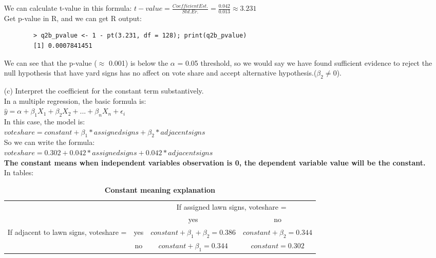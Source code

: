 \documentclass[12pt,letterpaper]{article}
\begin{document}
\begin{enumerate}
	We can calculate t-value in this formula: $t-value = \frac{Coefficient Est.}{Std. Er.} = \frac{0.042}{0.013} \approx 3.231$\\
	Get p-value in R, and we can get R output: 
	\begin{verbatim}
		> q2b_pvalue <- 1 - pt(3.231, df = 128); print(q2b_pvalue)
		[1] 0.0007841451
	\end{verbatim} 
	
	We can see that the p-value ($\approx$ 0.001) is below the $\alpha$ = 0.05 threshold, so we would say we have found sufficient evidence to reject the null hypothesis that have yard signs has no affect on vote share and accept alternative hypothesis.($\beta_2 \neq 0$).
	
	\newpage
	
	\item [(c)] Interpret the coefficient for the constant term substantively.\\
	
	In a multiple regression, the basic formula is:\\
	$\hat{y} = \alpha + \beta_1 X_1 + \beta_2 X_2 + ... + \beta_n X_n + \epsilon_i$\\
	In this case, the model is:\\
	$voteshare = constant + \beta_1 * assigned signs + \beta_2 * adjacent signs$\\
	So we can write the formula: \\
	$voteshare = 0.302 + 0.042 * assigned signs + 0.042 * adjacent signs$\\
	
	\textbf{The constant means when independent variables observation is 0, the dependent variable value will be the constant.} In tables: 
	\begin{table}[h]
		\centering
		\caption{\textbf{Constant meaning explanation}}
		\vspace{.2cm}
		\begin{tabular}{cc|cc}
			\multicolumn{2}{c}{} & \multicolumn{2}{c}{If assigned lawn signs, voteshare = } \\
			\multicolumn{2}{c}{} & yes & no \\
			\hline
			\multirow{2}{*}{If adjacent to lawn signs, voteshare = } & yes & $constant + \beta_1 + \beta_2  = 0.386 $ & $constant + \beta_2 = 0.344 $ \\
			& no & $constant + \beta_1 = 0.344 $ & $constant = 0.302 $ \\
		\end{tabular}
	\end{table}


\end{enumerate}
\end{document}
